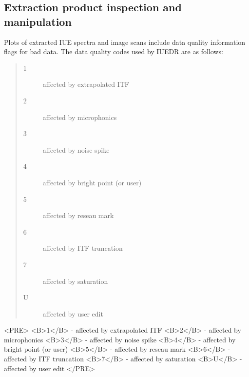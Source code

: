 \subsection {Extraction product inspection and manipulation}


Plots of extracted IUE spectra and image scans include data quality information
flags for bad data.
The data quality codes used by IUEDR are as follows:

\begin{latexonly}
\begin {quote}
\begin {description}
   \item [1] affected by extrapolated ITF
   \item [2] affected by microphonics
   \item [3] affected by noise spike
   \item [4] affected by bright point (or user)
   \item [5] affected by reseau mark
   \item [6] affected by ITF truncation
   \item [7] affected by saturation
   \item [U] affected by user edit
\end {description}
\end {quote}
\end{latexonly}

\begin{htmlonly}
\begin{rawhtml}
<PRE>
   <B>1</B> - affected by extrapolated ITF
   <B>2</B> - affected by microphonics
   <B>3</B> - affected by noise spike
   <B>4</B> - affected by bright point (or user)
   <B>5</B> - affected by reseau mark
   <B>6</B> - affected by ITF truncation
   <B>7</B> - affected by saturation
   <B>U</B> - affected by user edit
</PRE>
\end{rawhtml}
\end{htmlonly}

